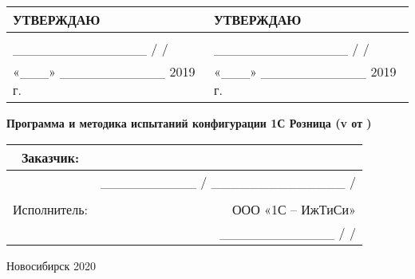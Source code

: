 \begin{titlepage}

\large

\begin{tabular}{|l|l|}
	\hline
	УТВЕРЖДАЮ & УТВЕРЖДАЮ \\
	\hline
	&  \\
	\hline
	\_\_\_\_\_\_\_\_\_\_\_\_\_\_ /                                       / & \_\_\_\_\_\_\_\_\_\_\_\_\_\_ /                                       / \\
	\hline
	«\_\_\_» \_\_\_\_\_\_\_\_\_\_\_ 2019 г. & «\_\_\_» \_\_\_\_\_\_\_\_\_\_\_ 2019 г. \\
	\hline
\end{tabular}

\vspace{2.25cm}
\begin{center}
\textbf{Программа и методика испытаний
	конфигурации 1С Розница (v \vhCurrentVersion \quad от \quad \vhCurrentDate)}



\end{center}
\begin{tabular}{|c|r|}
	\hline
	Заказчик: &  \\
	\hline
	& \_\_\_\_\_\_\_\_\_\_ / \_\_\_\_\_\_\_\_\_\_\_\_\_\_ / \\
	\hline
	&  \\
	\hline
	Исполнитель: & ООО «1С – ИжТиСи» \\
	\hline
	& \_\_\_\_\_\_\_\_\_\_\_\_ /                                   / \\
	\hline

\end{tabular}



\begin{center}
Новосибирск 2020
\end{center}
\end{titlepage}